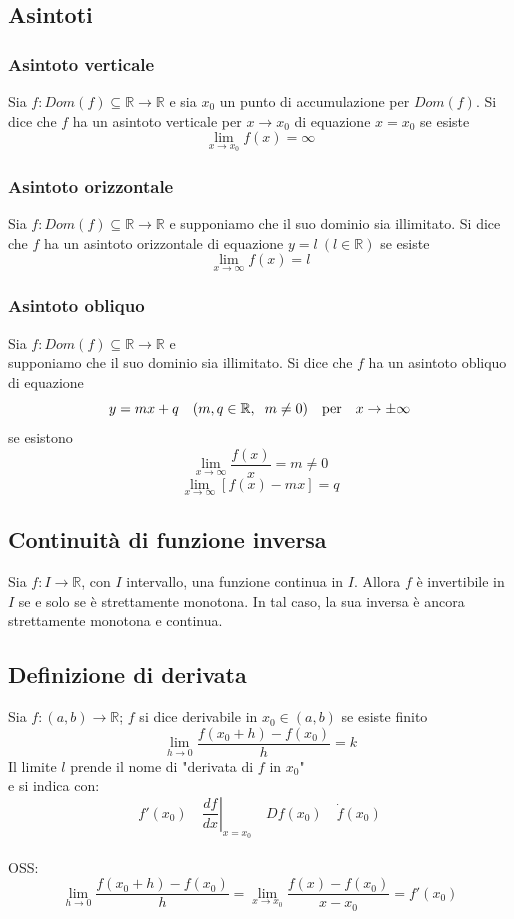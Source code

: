 \documentclass[12pt]{article}
\begin{document}
\subsection{Asintoti}
\subsubsection{Asintoto verticale}
Sia $f: Dom(f) \subseteq \mathbb{R} \to \mathbb{R}$ e sia
$x_0$ un punto di accumulazione per $Dom(f)$.
Si dice che $f$ ha un asintoto verticale
per $x \to x_0$ di equazione $x = x_0$
se esiste \[ \lim_{x \to x_0} f(x) = \infty\]

\subsubsection{Asintoto orizzontale}
Sia $f: Dom(f) \subseteq \mathbb{R} \to \mathbb{R}$ e
supponiamo che il suo dominio sia illimitato.
Si dice che $f$ ha un asintoto orizzontale
di equazione $y = l\ (l \in \mathbb{R})$
se esiste \[ \lim_{x \to \infty} f(x) = l\]
\subsubsection{Asintoto obliquo}
Sia $f: Dom(f) \subseteq \mathbb{R} \to \mathbb{R}$ e\\
supponiamo che il suo dominio sia illimitato.
Si dice che $f$ ha un asintoto obliquo
di equazione
\[ y = mx+q \quad (m, q \in \mathbb{R}, \hspace*{0.2cm} m \neq 0)\quad \text{per} \quad  x \to \pm \infty \]
se esistono
\[ \lim_{x \to \infty} \frac{f(x)}{x} = m \neq 0 \]
\[ \lim_{x \to \infty} [f(x) - mx] = q \]

\subsection{Continuità di funzione inversa}
Sia $f: I \to \mathbb{R}$, con $I$ intervallo,
una funzione continua in $I$. Allora $f$ è invertibile
in $I$ se e solo se è strettamente monotona.
In tal caso, la sua inversa è ancora strettamente
monotona e continua.

\subsection{Definizione di derivata}
Sia $f: (a,b) \to \mathbb{R}$; $f$ si dice
derivabile in $x_0 \in (a,b)$ se esiste finito
\[ \lim_{h \to 0} \frac{f(x_0 +h) - f(x_0)}{h}=k\]
Il limite $l$ prende il nome di "derivata di $f$ in $x_0$"\\
e si indica con:
\[ f'(x_0) \quad \left. \frac{df}{dx} \right |_{x = x_0} \quad  Df(x_0) \quad \dot{f}(x_0) \]
\\
OSS:
\[ \lim_{h \to 0} \frac{f(x_0 +h) - f(x_0)}{h} = \lim_{x \to x_0} \frac{f(x) - f(x_0)}{x - x_0} = f'(x_0)\]
\end{document}
